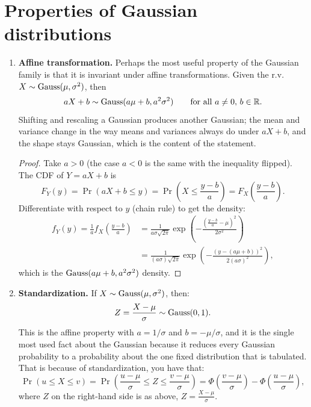 \section{Properties of Gaussian distributions}
\label{sec:gauss-properties}

\begin{enumerate}
\item \textbf{Affine transformation.}
Perhaps the most useful property of the Gaussian family is that it is invariant under affine transformations.
Given the r.v.\ $X \sim \text{Gauss}(\mu, \sigma^2)$, then
\[
aX + b \sim \text{Gauss}(a\mu + b, a^2\sigma^2) \qquad \text{for all } a \neq 0, \, b \in \mathbb{R}.
\]
Shifting and rescaling a Gaussian produces another Gaussian; the mean and variance change in the way means and variances always do under $aX + b$, and the shape stays Gaussian, which is the content of the statement.

\begin{proof}
Take $a > 0$ (the case $a < 0$ is the same with the inequality flipped).
The CDF of $Y = aX + b$ is
\[
F_Y(y) = \Pr(aX + b \leq y) = \Pr \left( X \leq \frac{y - b}{a} \right) = F_X \left( \frac{y-b}{a} \right).
\]
Differentiate with respect to $y$ (chain rule) to get the density:
\begin{align*}
f_Y(y) = \frac{1}{a} f_X \left( \frac{y - b}{a} \right) &= \frac{1}{a \sigma \sqrt{2\pi}} \exp \left( - \frac{\left( \frac{y-b}{a} - \mu \right)^2}{2 \sigma^2} \right) \\
&= \frac{1}{(a\sigma) \sqrt{2\pi}} \exp \left( - \frac{(y - (a\mu + b))^2}{2 (a\sigma)^2} \right),
\end{align*}
which is the $\text{Gauss}(a\mu + b, a^2 \sigma^2)$ density.
\end{proof}

\item \textbf{Standardization.}
If $X \sim \text{Gauss}(\mu, \sigma^2)$, then:
\[
Z = \frac{X - \mu}{\sigma} \sim \text{Gauss}(0, 1).
\]
This is the affine property with $a = 1/\sigma$ and $b = -\mu/\sigma$, and it is the single most used fact about the Gaussian because it reduces every Gaussian probability to a probability about the one fixed distribution that is tabulated.
That is because of standardization, you have that:
\[
\Pr(u \leq X \leq v) = \Pr \left( \frac{u - \mu}{\sigma} \leq Z \leq \frac{v-\mu}{\sigma}\right) = \Phi \left( \frac{v-\mu}{\sigma} \right) - \Phi \left( \frac{u-\mu}{\sigma} \right),
\]
where $Z$ on the right-hand side is as above, $Z = \frac{X - \mu}{\sigma}$.


\end{enumerate}
